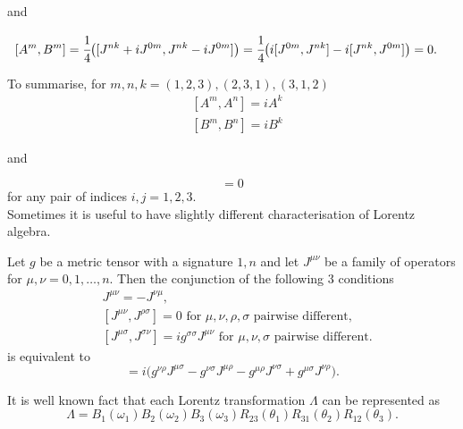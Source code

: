 \documentclass[main.tex]{subfiles}
\begin{document}
and

\begin{align*}
& [A^m, B^m] = \cfrac{1}{4}\big([J^{nk} + iJ^{0m}, J^{nk} - iJ^{0m}]\big) = 
\cfrac{1}{4}\big(i[J^{0m}, J^{nk}] - i[J^{nk}, J^{0m}]\big) = 0.
\end{align*}


To summarise,
for $m, n, k = (1, 2, 3), (2, 3, 1), (3, 1, 2)$
\begin{align*}
& [A^m, A^n] = iA^k \\
& [B^m, B^n] = iB^k
\end{align*} 

and

\begin{equation}
[A^i, B^j] = 0
\end{equation}
for any pair of indices $i, j = 1, 2, 3$.\\

Sometimes it is useful to have slightly different characterisation of Lorentz algebra.

\begin{proposition}
Let $g$ be a metric tensor with a signature $1, n$ and let $J^{\mu\nu}$ be a family of operators for $\mu, \nu = 0, 1, \dots, n$. Then the conjunction of the following 3 conditions
\begin{align}
& J^{\mu\nu} = -J^{\nu\mu},\\
& [J^{\mu\nu}, J^{\rho\sigma}] = 0 \text{ for } \mu, \nu, \rho, \sigma \text{ pairwise different},\\
& [J^{\mu\sigma}, J^{\sigma\nu}] = ig^{\sigma\sigma}J^{\mu\nu} \text{ for } \mu, \nu,  \sigma \text{ pairwise different}.
\end{align}
is equivalent to 
\begin{equation}
[J^{\mu\nu}, J^{\rho\sigma}] = 
i\big( g^{\nu\rho } J^{\mu\sigma} 
- g^{\nu\sigma} J^{\mu\rho}
- g^{\mu\rho} J^{\nu\sigma}
+ g^{\mu\sigma} J^{\nu\rho}\big).
\end{equation}
\end{proposition}

It is well known fact that each Lorentz transformation $\Lambda$ can be represented as
\begin{equation}
\Lambda = B_1(\omega_1)B_2(\omega_2)B_3(\omega_3)R_{23}(\theta_1)R_{31}(\theta_2)R_{12}(\theta_3).
\end{equation}
\end{document}
